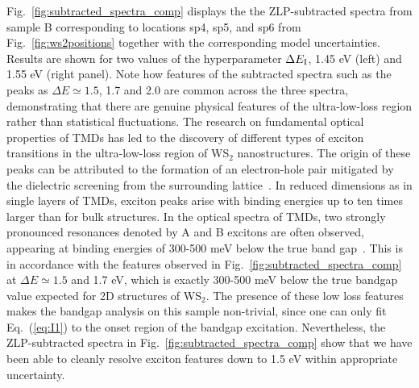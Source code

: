 Fig.~\ref{fig:subtracted_spectra_comp} displays the
the ZLP-subtracted spectra from sample B corresponding to locations sp4, sp5, and sp6
    from Fig.~\ref{fig:ws2positions} together with the corresponding model uncertainties.
    Results are shown for two values of the hyperparameter $\Delta E_{\rm I}$,
    1.45 eV (left) and 1.55 eV (right panel).
    Note how features of the subtracted spectra such as the peaks as $\Delta E\simeq 1.5$,
    1.7 and 2.0 are common across the three spectra, demonstrating that there
    are genuine physical features of the ultra-low-loss region rather than statistical
    fluctuations.
The research on fundamental optical properties of TMDs has led to the discovery of different 
types of exciton transitions in the ultra-low-loss region of WS$_2$ nanostructures. 
%
The origin of these peaks can be attributed to the formation of an electron-hole pair mitigated
by the dielectric screening from the surrounding lattice~\cite{Hanbicki:2016}.
%
In reduced dimensions as in single layers of TMDs, exciton peaks arise with binding energies
up to ten times larger than for bulk structures.
%
In the optical spectra of TMDs, two strongly pronounced resonances denoted by A and B
excitons are often observed, appearing at binding energies of 300-500 meV below the true band gap~\cite{Karivaj:2019}.
%
This is in accordance with the features observed in Fig.~\ref{fig:subtracted_spectra_comp} at 
$\Delta E\simeq 1.5$ and 1.7 eV, which is exactly 300-500 meV below the true bandgap value
expected for 2D structures of WS$_2$. 
%
The presence of these low loss features makes the bandgap analysis on this sample 
non-trivial, since one can only fit Eq.~(\ref{eq:I1}) to the onset region of the 
bandgap excitation. 
%
Nevertheless, the ZLP-subtracted spectra in Fig.~\ref{fig:subtracted_spectra_comp} show that
we have been able to cleanly resolve exciton features down to 1.5 eV within appropriate
uncertainty.

